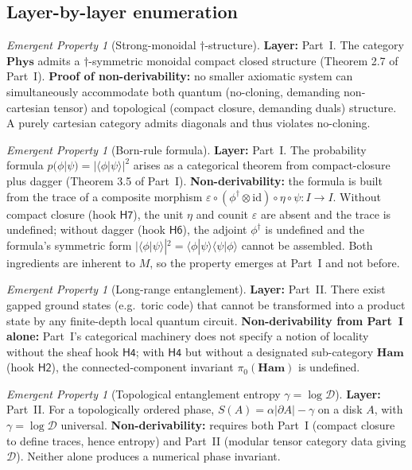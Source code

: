 \documentclass[12pt]{article}
\theoremstyle{definition}
\theoremstyle{remark}
\newtheorem{emerg}[theorem]{Emergent Property}
\newcommand{\Phys}{\mathbf{Phys}}
\newcommand{\Ham}{\mathbf{Ham}}
\newcommand{\id}{\mathrm{id}}
\begin{document}
\subsection{Layer-by-layer enumeration}

\begin{emerg}[Strong-monoidal $\dagger$-structure]
\label{em:smc}
\textbf{Layer:} Part~I. The category $\Phys$ admits a $\dagger$-symmetric
monoidal compact closed structure (Theorem 2.7 of Part~I). \textbf{Proof of
non-derivability:} no smaller axiomatic system can simultaneously accommodate
both quantum (no-cloning, demanding non-cartesian tensor) and topological
(compact closure, demanding duals) structure. A purely cartesian category
admits diagonals and thus violates no-cloning.
\end{emerg}

\begin{emerg}[Born-rule formula]
\label{em:born}
\textbf{Layer:} Part~I. The probability formula $p(\phi | \psi) =
|\langle \phi | \psi \rangle|^2$ arises as a categorical theorem from
compact-closure plus dagger (Theorem 3.5 of Part~I).
\textbf{Non-derivability:} the formula is built from the trace of a
composite morphism $\varepsilon \circ (\phi^\dagger \otimes \id) \circ
\eta \circ \psi : I \to I$. Without compact closure (hook
$\mathsf{H7}$), the unit $\eta$ and counit $\varepsilon$ are absent and
the trace is undefined; without dagger (hook $\mathsf{H6}$), the
adjoint $\phi^\dagger$ is undefined and the formula's symmetric form
$|\langle\phi|\psi\rangle|^2 = \langle\phi|\psi\rangle\langle\psi|\phi\rangle$
cannot be assembled. Both ingredients are inherent to $M$, so the
property emerges at Part~I and not before.
\end{emerg}

\begin{emerg}[Long-range entanglement]
\label{em:lre}
\textbf{Layer:} Part~II. There exist gapped ground states (e.g.\ toric code)
that cannot be transformed into a product state by any finite-depth local
quantum circuit. \textbf{Non-derivability from Part~I alone:} Part~I's
categorical machinery does not specify a notion of locality without the
sheaf hook $\mathsf{H4}$; with $\mathsf{H4}$ but without a designated
sub-category $\Ham$ (hook $\mathsf{H2}$), the connected-component invariant
$\pi_0(\Ham)$ is undefined.
\end{emerg}

\begin{emerg}[Topological entanglement entropy $\gamma = \log \mathcal{D}$]
\label{em:tee}
\textbf{Layer:} Part~II. For a topologically ordered phase, $S(A) = \alpha
|\partial A| - \gamma$ on a disk $A$, with $\gamma = \log \mathcal{D}$
universal. \textbf{Non-derivability:} requires both Part~I (compact closure
to define traces, hence entropy) and Part~II (modular tensor category data
giving $\mathcal{D}$). Neither alone produces a numerical phase invariant.
\end{emerg}
\end{document}
